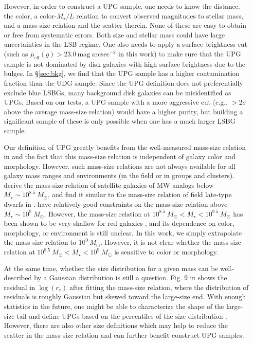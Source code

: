 \documentclass[twocolumn,astrosymb,twocolappendix]{aastex631}
\newcommand{\sbunit}{\mathrm{mag\ arcsec}^{-2}}
\newcommand{\sbeff}{\overline{\mu}_{\mathrm{eff}}(g)}
\begin{document}
\begin{CJK*}{UTF8}{gbsn}
However, in order to construct a UPG sample, one needs to know the distance, the color, a color-$M_\star/L$ relation to convert observed magnitudes to stellar mass, and a mass-size relation and the scatter therein. None of these are easy to obtain or free from systematic errors. Both size and stellar mass could have large uncertainties in the LSB regime. One also needs to apply a surface brightness cut (such as $\sbeff > 23.0\ \sbunit$ in this work) to make sure that the UPG sample is not dominated by disk galaxies with high surface brightness due to the bulges. In \S\ref{sec:bkg}, we find that the UPG sample has a higher contamination fraction than the UDG sample. Since the UPG definition does not preferentially exclude blue LSBGs, many background disk galaxies can be misidentified as UPGs. Based on our tests, a UPG sample with a more aggressive cut (e.g., $>2\sigma$ above the average mass-size relation) would have a higher purity, but building a significant sample of these is only possible when one has a much larger LSBG sample.

Our definition of UPG greatly benefits from the well-measured mass-size relation in \citet{ELVES-I} and the fact that this mass-size relation is independent of galaxy color and morphology. However, such mass-size relations are not always available for all galaxy mass ranges and environments (in the field or in groups and clusters). \citet{ELVES-I} derive the mass-size relation of satellite galaxies of MW analogs below $M_\star \sim 10^{8.5}\ M_\odot$, and find it similar to the mass-size relation of field late-type dwarfs in \citet{Karachentsev2013}. \citet{Lange2015} have relatively good constraints on the mass-size relation above $M_\star \sim 10^{9}\ M_\odot$. However, the mass-size relation at $10^{8.5}\ M_\odot < M_\star < 10^{9.5}\ M_\odot$ has been shown to be very shallow for red galaxies \citep{SmithCastelli2008,Misgeld2008,Misgeld2011,Eigenthaler2018}, and its dependence on color, morphology, or environment is still unclear. In this work, we simply extrapolate the \citet{ELVES-I} mass-size relation to $10^9\ M_\odot$. However, it is not clear whether the mass-size relation at $10^{8.5}\ M_\odot < M_\star < 10^{9}\ M_\odot$ is sensitive to color or morphology. 

At the same time, whether the size distribution for a given mass can be well-described by a Gaussian distribution is still a question. Fig. 9 in \citet{ELVES-I} shows the residual in $\log(r_e)$ after fitting the mass-size relation, where the distribution of residuals is roughly Gaussian but skewed toward the large-size end. With enough statistics in the future, one might be able to characterize the shape of the large-size tail and define UPGs based on the percentiles of the size distribution \citep{Greene2022}. However, there are also other size definitions which may help to reduce the scatter in the mass-size relation \citep[e.g.,][]{Miller2019,Mowla2019,Trujillo2020,Chamba2022} and can further benefit construct UPG samples. 


\end{CJK*}
\end{document}
